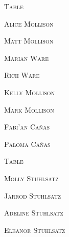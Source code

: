 \documentclass[12pt]{article}
\begin{document}
\newpage

\vspace*{.25in}

\textsc{\Huge Table}
\vspace*{.3in}


\vspace*{\fill}

\textsc{\Huge Alice Mollison}

\vspace*{.15in}
\textsc{\Huge Matt Mollison}

\vspace*{.15in}
\textsc{\Huge Marian Ware}

\vspace*{.15in}
\textsc{\Huge Rich Ware}

\vspace*{.15in}
\textsc{\Huge Kelly Mollison}

\vspace*{.15in}
\textsc{\Huge Mark Mollison}

\vspace*{.15in}
\textsc{\Huge Fabi\a'an Ca\~{n}as}

\vspace*{.15in}
\textsc{\Huge Paloma Ca\~{n}as}

\vspace*{\fill}

\newpage

\vspace*{.25in}

\textsc{\Huge Table}
\vspace*{.3in}


\vspace*{\fill}

\textsc{\Huge Molly Stuhlsatz}

\vspace*{.15in}
\textsc{\Huge Jarrod Stuhlsatz}

\vspace*{.15in}
\textsc{\Huge Adeline Stuhlsatz}

\vspace*{.15in}
\textsc{\Huge Eleanor Stuhlsatz}
\end{document}
